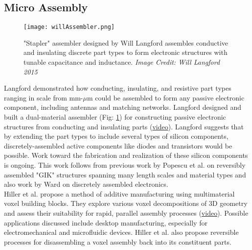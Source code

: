 {\subsection{Micro Assembly}

\begin{figure}
  \texttt{[image: willAssembler.png]}
  \caption{"Stapler" assembler designed by Will Langford assembles conductive and insulating discrete part types to form electronic structures with tunable capacitance and inductance.  \textit{Image Credit: Will Langford 2015}}
  \label{fig:willAssembler}
\end{figure}



Langford demonstrated how conducting, insulating, and resistive part types ranging in scale from mm-$\mu$m could be assembled to form any passive electronic component, including antennas and matching networks\cite{Langford2014}.  Langford designed and built a dual-material assembler (Fig: \ref{fig:willAssembler}) for constructing passive electronic structures from conducting and insulating parts (\href{http://dma.cba.mit.edu/stapler/video/dualstapler_full_1.mp4}{video})\cite{LangfordWillGhassaeiAmandaGershenfeld2016}.  Langford suggests that by extending the part types to include several types of silicon components, discretely-assembled active components like diodes and transistors would be possible.  Work toward the fabrication and realization of these silicon components is ongoing.  This work follows from previous work by Popescu et al. on reversibly assembled "GIK" structures spanning many length scales and material types\cite{Popescu} and also work by Ward on discretely assembled electronics\cite{Ward2010}.
\\

Hiller et al. propose a method of additive manufacturing using multimaterial voxel building blocks\cite{Hiller2009a}.  They explore various voxel decompositions of 3D geometry and assess their suitability for rapid, parallel assembly processes (\href{https://www.youtube.com/watch?v=-szjlhVMGh4}{video}).  Possible applications discussed include desktop manufacturing, especially for electromechanical and microfluidic devices.  Hiller et al. also propose reversible processes for disassembling a voxel assembly back into its constituent parts\cite{Hiller2005}.
\\

}
